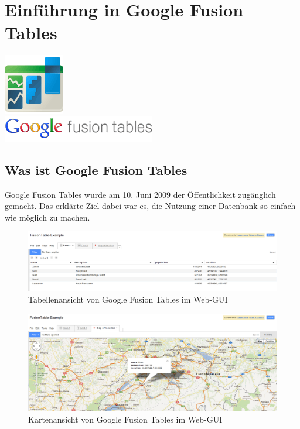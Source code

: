 \chapter{Einführung in Google Fusion Tables}
\label{einfuehrung}

\begin{center}
\includegraphics[scale=0.8]{images/einfuehrung/gft-logo} \\[0.3cm]
\includegraphics[scale=0.6]{images/einfuehrung/gft-text-logo}
\end{center}

\section{Was ist Google Fusion Tables}
Google Fusion Tables wurde am 10. Juni 2009 der Öffentlichkeit zugänglich gemacht\cite{fusion-table-announce}. Das erklärte Ziel dabei war es, die Nutzung einer Datenbank so einfach wie möglich zu machen.

\begin{figure}[!ht]
	\centering
	\includegraphics[width=\textwidth]{images/einfuehrung/gft-webgui-table}
	\caption{Tabellenansicht von Google Fusion Tables im Web-GUI}
	\label{gft-webgui-table}
\end{figure}

\begin{figure}[!ht]
	\centering
	\includegraphics[width=\textwidth]{images/einfuehrung/gft-webgui-map}
	\caption{Kartenansicht von Google Fusion Tables im Web-GUI}
	\label{gft-webgui-map}
\end{figure}

